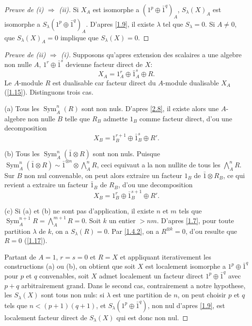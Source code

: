 \documentclass[11pt,a4paper]{article}
\theoremstyle{plain}
\theoremstyle{definition}
\DeclareMathOperator{\Sym}{Sym}
\begin{document}
\begin{proof}[Preuve de (i) $\Rightarrow$ (ii)]
Si $X_A$ est isomorphe a $(1^p\oplus\bar{1}^q)_A$, $S_\lambda(X)_A$ est isomorphe a $S_\lambda(1^p\oplus\bar{1}^q)_A$. D'apres \ref{1.9}, il existe $\lambda$ tel que $S_\lambda=0$. Si $A\neq0$, que $S_\lambda(X)_A=0$ implique que $S_\lambda(X)=0$.
\end{proof}

\begin{proof}[Preuve de (ii) $\Rightarrow$ (i)]
Supposons qu'apres extension des scalaires a une algebre non nulle $A$, $1^r\oplus\bar{1}^s$ devienne facteur direct de $X$:
\[
X_A=1_A^r\oplus\bar{1}_A^s\oplus R.
\]
Le $A$-module $R$ est dualisable car facteur direct du $A$-module dualisable $X_A$ (\ref{1.15}). Distinguons trois cas.

(a) Tous les $\Sym^n_A(R)$ sont non nuls. D'apres \ref{2.8}, il existe alors une $A$-algebre non nulle $B$ telle que $R_B$ admette $1_B$ comme facteur direct, d'ou une decomposition
\[
X_B=1_B^{r+1}\oplus\bar{1}_B^s\oplus R'.
\]

(b) Tous les $\Sym^n_A(\bar{1}\otimes R)$ sont non nuls. Puisque $\Sym^n_A(\bar{1}\otimes R)\sim\bar{1}^{\otimes n}\otimes\bigwedge^n_A R$, ceci equivaut a la non nullite de tous les $\bigwedge^n_A R$. Sur $B$ non nul convenable, on peut alors extraire un facteur $1_B$ de $\bar{1}\otimes R_B$, ce qui revient a extraire un facteur $\bar{1}_B$ de $R_B$, d'ou une decomposition
\[
X_B=1_B^r\oplus\bar{1}_B^{s+1}\oplus R'.
\]

(c) Si (a) et (b) ne sont pas d'application, il existe $n$ et $m$ tels que $\Sym^{n+1}_A R=\bigwedge^{m+1}_A R=0$. Soit $k$ un entier $>nm$. D'apres \ref{1.7}, pour toute partition $\lambda$ de $k$, on a $S_\lambda(R)=0$. Par \ref{1.4.2}, on a $R^{\otimes k}=0$, d'ou resulte que $R=0$ (\ref{1.17}).

Partant de $A=1$, $r=s=0$ et $R=X$ et appliquant iterativement les constructions (a) ou (b), on obtient que soit $X$ est localement isomorphe a $1^p\oplus\bar{1}^q$ pour $p$ et $q$ convenables, soit $X$ admet localement un facteur direct $1^p\oplus\bar{1}^q$ avec $p+q$ arbitrairement grand. Dans le second cas, contrairement a notre hypothese, les $S_\lambda(X)$ sont tous non nuls: si $\lambda$ est une partition de $n$, on peut choisir $p$ et $q$ tels que $n<(p+1)(q+1)$, et $S_\lambda(1^p\oplus\bar{1}^q)$, non nul d'apres \ref{1.9}, est localement facteur direct de $S_\lambda(X)$ qui est donc non nul.
\end{proof}
\end{document}

